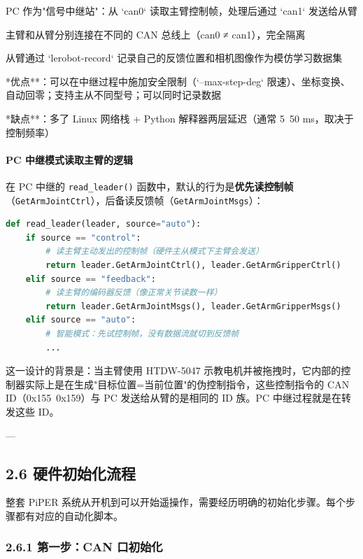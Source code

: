 \documentclass[UTF8,a4paper,11pt]{ctexart}
\begin{document}
\item PC 作为"信号中继站"：从 `can0` 读取主臂控制帧，处理后通过 `can1` 发送给从臂
\item 主臂和从臂分别连接在不同的 CAN 总线上（can0 ≠ can1），完全隔离
\item 从臂通过 `lerobot-record` 记录自己的反馈位置和相机图像作为模仿学习数据集
\item **优点**：可以在中继过程中施加安全限制（`--max-step-deg` 限速）、坐标变换、自动回零；支持主从不同型号；可以同时记录数据
\item **缺点**：多了 Linux 网络栈 + Python 解释器两层延迟（通常 5~50 ms，取决于控制频率）

\paragraph{PC 中继模式读取主臂的逻辑}


在 PC 中继的 \texttt{read_leader()} 函数中，默认的行为是\textbf{优先读控制帧}（\texttt{GetArmJointCtrl}），后备读反馈帧（\texttt{GetArmJointMsgs}）：

\begin{lstlisting}[language=python]
def read_leader(leader, source="auto"):
    if source == "control":
        # 读主臂主动发出的控制帧（硬件主从模式下主臂会发送）
        return leader.GetArmJointCtrl(), leader.GetArmGripperCtrl()
    elif source == "feedback":
        # 读主臂的编码器反馈（像正常关节读数一样）
        return leader.GetArmJointMsgs(), leader.GetArmGripperMsgs()
    elif source == "auto":
        # 智能模式：先试控制帧，没有数据流就切到反馈帧
        ...
\end{lstlisting}

这一设计的背景是：当主臂使用 HTDW-5047 示教电机并被拖拽时，它内部的控制器实际上是在生成"目标位置=当前位置"的伪控制指令，这些控制指令的 CAN ID（0x155~0x159）与 PC 发送给从臂的是相同的 ID 族。PC 中继过程就是在转发这些 ID。

---

\subsection{2.6 硬件初始化流程}

整套 PiPER 系统从开机到可以开始遥操作，需要经历明确的初始化步骤。每个步骤都有对应的自动化脚本。

\subsubsection{2.6.1 第一步：CAN 口初始化}
\end{document}
